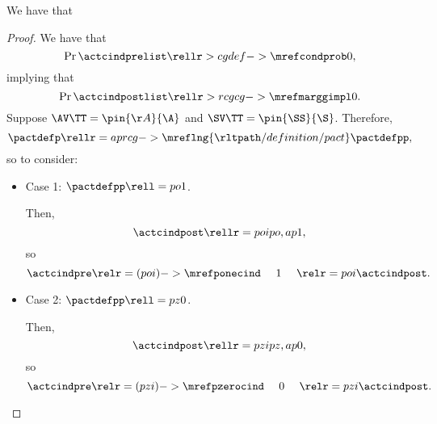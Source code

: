 \begin{proposition}
  We have that %
\end{proposition}

\begin{proof}
  We have that 
  $$\Pr{\actcindprelist} \rellr > cg {def->\mrefcondprob} 0,$$ 
  implying that
  $$\Pr{\actcindpostlist} \rellr > rcg {cg->\mrefmarggimpl} 0.$$
  Suppose 
  $\AV\TT = \pin{\AA}{\A}$
  and
  $\SV\TT = \pin{\SS}{\S}$. Therefore,
  $$\pactdefp \rellr = ap {rcg->\mreflng{\rltpath/definition/pact}} \pactdefpp,$$
  so  to consider:
  \begin{itemize}
    \item {} Case 1: $\pactdefpp \rell = po 1$.

      Then,
      $$\actcindpost \rellr = poi po,ap 1,$$
      so
      $$\actcindpre \relr = (poi)->{\mrefponecind} \ \ \ \ 1\ \ \ \ \relr = poi \actcindpost.$$
    \item {} Case 2: $\pactdefpp \rell = pz 0$.

      Then,
      $$\actcindpost \rellr = pzi pz,ap 0,$$
      so
      $$\actcindpre \relr = (pzi)->{\mrefpzerocind} \ \ \ \ 0\ \ \ \ \relr = pzi \actcindpost.$$
  \end{itemize}
\end{proof}
